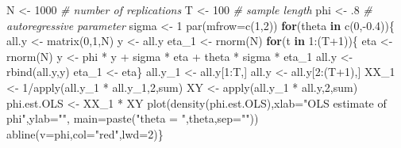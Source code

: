 \documentclass[
  12pt,
]{book}
\newenvironment{Shaded}{\begin{snugshade}}{\end{snugshade}}
\newcommand{\AttributeTok}[1]{\textcolor[rgb]{0.77,0.63,0.00}{#1}}
\newcommand{\CommentTok}[1]{\textcolor[rgb]{0.56,0.35,0.01}{\textit{#1}}}
\newcommand{\ControlFlowTok}[1]{\textcolor[rgb]{0.13,0.29,0.53}{\textbf{#1}}}
\newcommand{\DecValTok}[1]{\textcolor[rgb]{0.00,0.00,0.81}{#1}}
\newcommand{\FloatTok}[1]{\textcolor[rgb]{0.00,0.00,0.81}{#1}}
\newcommand{\FunctionTok}[1]{\textcolor[rgb]{0.00,0.00,0.00}{#1}}
\newcommand{\NormalTok}[1]{#1}
\newcommand{\OtherTok}[1]{\textcolor[rgb]{0.56,0.35,0.01}{#1}}
\newcommand{\SpecialCharTok}[1]{\textcolor[rgb]{0.00,0.00,0.00}{#1}}
\newcommand{\StringTok}[1]{\textcolor[rgb]{0.31,0.60,0.02}{#1}}
\theoremstyle{definition}
\theoremstyle{definition}
\theoremstyle{definition}
\theoremstyle{definition}
\theoremstyle{remark}
\begin{document}
\begin{Shaded}
\begin{Highlighting}[]
\NormalTok{N }\OtherTok{\textless{}{-}} \DecValTok{1000} \CommentTok{\# number of replications}
\NormalTok{T }\OtherTok{\textless{}{-}} \DecValTok{100} \CommentTok{\# sample length}
\NormalTok{phi }\OtherTok{\textless{}{-}}\NormalTok{ .}\DecValTok{8} \CommentTok{\# autoregressive parameter}
\NormalTok{sigma }\OtherTok{\textless{}{-}} \DecValTok{1}
\FunctionTok{par}\NormalTok{(}\AttributeTok{mfrow=}\FunctionTok{c}\NormalTok{(}\DecValTok{1}\NormalTok{,}\DecValTok{2}\NormalTok{))}
\ControlFlowTok{for}\NormalTok{(theta }\ControlFlowTok{in} \FunctionTok{c}\NormalTok{(}\DecValTok{0}\NormalTok{,}\SpecialCharTok{{-}}\FloatTok{0.4}\NormalTok{))\{}
\NormalTok{  all.y }\OtherTok{\textless{}{-}} \FunctionTok{matrix}\NormalTok{(}\DecValTok{0}\NormalTok{,}\DecValTok{1}\NormalTok{,N)}
\NormalTok{  y     }\OtherTok{\textless{}{-}}\NormalTok{ all.y}
\NormalTok{  eta\_1 }\OtherTok{\textless{}{-}} \FunctionTok{rnorm}\NormalTok{(N)}
  \ControlFlowTok{for}\NormalTok{(t }\ControlFlowTok{in} \DecValTok{1}\SpecialCharTok{:}\NormalTok{(T}\SpecialCharTok{+}\DecValTok{1}\NormalTok{))\{}
\NormalTok{    eta }\OtherTok{\textless{}{-}} \FunctionTok{rnorm}\NormalTok{(N)}
\NormalTok{    y }\OtherTok{\textless{}{-}}\NormalTok{ phi }\SpecialCharTok{*}\NormalTok{ y }\SpecialCharTok{+}\NormalTok{ sigma }\SpecialCharTok{*}\NormalTok{ eta }\SpecialCharTok{+}\NormalTok{ theta }\SpecialCharTok{*}\NormalTok{ sigma }\SpecialCharTok{*}\NormalTok{ eta\_1}
\NormalTok{    all.y }\OtherTok{\textless{}{-}} \FunctionTok{rbind}\NormalTok{(all.y,y)}
\NormalTok{    eta\_1 }\OtherTok{\textless{}{-}}\NormalTok{ eta\}}
\NormalTok{  all.y\_1 }\OtherTok{\textless{}{-}}\NormalTok{ all.y[}\DecValTok{1}\SpecialCharTok{:}\NormalTok{T,]}
\NormalTok{  all.y   }\OtherTok{\textless{}{-}}\NormalTok{ all.y[}\DecValTok{2}\SpecialCharTok{:}\NormalTok{(T}\SpecialCharTok{+}\DecValTok{1}\NormalTok{),]}
\NormalTok{  XX\_1 }\OtherTok{\textless{}{-}} \DecValTok{1}\SpecialCharTok{/}\FunctionTok{apply}\NormalTok{(all.y\_1 }\SpecialCharTok{*}\NormalTok{ all.y\_1,}\DecValTok{2}\NormalTok{,sum)}
\NormalTok{  XY   }\OtherTok{\textless{}{-}} \FunctionTok{apply}\NormalTok{(all.y\_1 }\SpecialCharTok{*}\NormalTok{ all.y,}\DecValTok{2}\NormalTok{,sum)}
\NormalTok{  phi.est.OLS }\OtherTok{\textless{}{-}}\NormalTok{ XX\_1 }\SpecialCharTok{*}\NormalTok{ XY}
  \FunctionTok{plot}\NormalTok{(}\FunctionTok{density}\NormalTok{(phi.est.OLS),}\AttributeTok{xlab=}\StringTok{"OLS estimate of phi"}\NormalTok{,}\AttributeTok{ylab=}\StringTok{""}\NormalTok{,}
       \AttributeTok{main=}\FunctionTok{paste}\NormalTok{(}\StringTok{"theta = "}\NormalTok{,theta,}\AttributeTok{sep=}\StringTok{""}\NormalTok{))}
  \FunctionTok{abline}\NormalTok{(}\AttributeTok{v=}\NormalTok{phi,}\AttributeTok{col=}\StringTok{"red"}\NormalTok{,}\AttributeTok{lwd=}\DecValTok{2}\NormalTok{)\}}
\end{Highlighting}
\end{Shaded}
\end{document}
